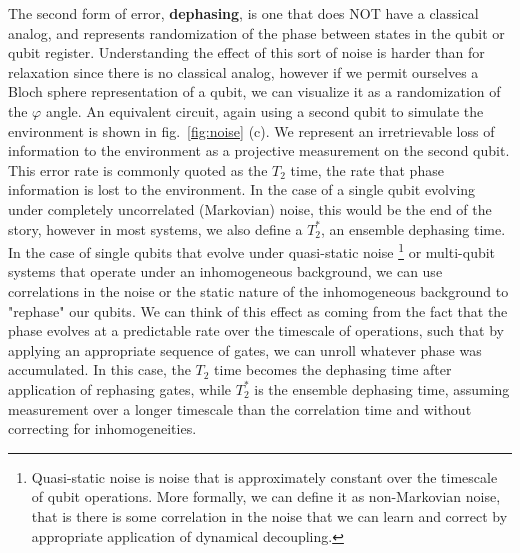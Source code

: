 The second form of error, \textbf{dephasing}, is one that does NOT have a classical analog, and represents randomization of the phase between
states in the qubit or qubit register. Understanding the effect of this sort of noise is harder than for relaxation since there is no
classical analog, however if we permit ourselves a Bloch sphere representation of a qubit, we can visualize it
as a randomization of the $\varphi$ angle. An equivalent circuit, again using a second qubit to simulate the
environment is shown in fig.~\ref{fig:noise} (c). We represent an irretrievable loss of information to the
environment as a projective measurement on the second qubit. This error rate is commonly quoted as the $T_2$ time,
the rate that phase information is lost to the environment. In the case of a single qubit evolving under completely uncorrelated
(Markovian) noise, this would be the end of the story, however in most systems, we also define a $T_2^*$, an ensemble
dephasing time. In the case of single qubits that evolve under quasi-static noise
\footnote{Quasi-static noise is noise that is approximately constant over the timescale of qubit operations. More formally,
we can define it as non-Markovian noise, that is there is some correlation in the noise that we can learn and correct
by appropriate application of dynamical decoupling.} or multi-qubit systems that operate
under an inhomogeneous background, we can use correlations in the noise or the static nature of the inhomogeneous background
to "rephase" our qubits\cite{PhysRev.80.580,dynamic-decoupling-biercuk}. We can think of this effect as coming from the
fact that the phase evolves at a predictable rate over the timescale of operations, such that by applying an appropriate sequence
of gates, we can unroll whatever phase was accumulated.  In this case, the $T_2$ time becomes the dephasing time after
application of rephasing gates, while $T_2^*$ is the ensemble dephasing time, assuming measurement over a longer timescale
than the correlation time and without correcting for inhomogeneities.

